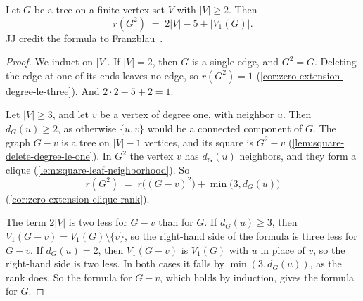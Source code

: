 \begin{theorem}
  \label{thm:degree-one-rank-tree}
  \leanok
  Let $G$ be a tree on a finite vertex set $V$ with $|V| \ge 2$. Then
  \[
    r(G^2) \;=\; 2|V| - 5 + |V_1(G)| .
  \]
  JJ credit the formula to Franzblau~\cite{franzblau2000}.
\end{theorem}
\begin{proof}
  \leanok
  We induct on $|V|$. If $|V| = 2$, then $G$ is a single edge, and
  $G^2 = G$. Deleting the edge at one of its ends leaves no edge, so
  $r(G^2) = 1$ (\cref{cor:zero-extension-degree-le-three}). And
  $2 \cdot 2 - 5 + 2 = 1$.

  Let $|V| \ge 3$, and let $v$ be a vertex of degree one, with neighbor
  $u$. Then $d_G(u) \ge 2$, as otherwise $\{u, v\}$ would be a connected
  component of $G$. The graph $G - v$ is a tree on $|V| - 1$ vertices,
  and its square is $G^2 - v$ (\cref{lem:square-delete-degree-le-one}).
  In $G^2$ the vertex $v$ has $d_G(u)$ neighbors, and they form a clique
  (\cref{lem:square-leaf-neighborhood}). So
  \[
    r(G^2) \;=\; r\bigl((G - v)^2\bigr) + \min\bigl(3, d_G(u)\bigr)
  \]
  (\cref{cor:zero-extension-clique-rank}).

  The term $2|V|$ is two less for $G - v$ than for $G$. If
  $d_G(u) \ge 3$, then $V_1(G - v) = V_1(G) \setminus \{v\}$, so the
  right-hand side of the formula is three less for $G - v$. If
  $d_G(u) = 2$, then $V_1(G - v)$ is $V_1(G)$ with $u$ in place of $v$,
  so the right-hand side is two less. In both cases it falls by
  $\min(3, d_G(u))$, as the rank does. So the formula for $G - v$, which
  holds by induction, gives the formula for $G$.
\end{proof}

